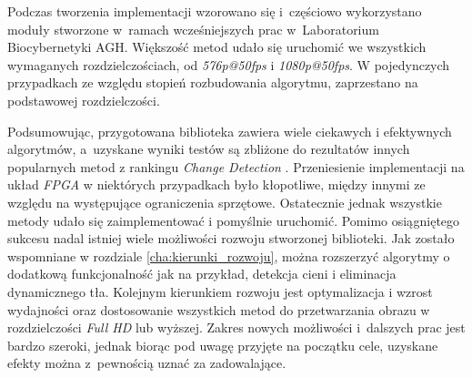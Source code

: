 Podczas tworzenia implementacji wzorowano się i~częściowo wykorzystano moduły stworzone w~ramach wcześniejszych prac  w~Laboratorium Biocybernetyki AGH. 
Większość metod udało się uruchomić we wszystkich wymaganych rozdzielczościach, od \textit{576p@50fps} i \textit{1080p@50fps}. 
W pojedynczych przypadkach ze względu stopień rozbudowania algorytmu, zaprzestano na podstawowej rozdzielczości.

Podsumowując, przygotowana biblioteka zawiera wiele ciekawych i efektywnych algorytmów, a~uzyskane wyniki testów są zbliżone do rezultatów innych popularnych metod z rankingu \textit{Change Detection} \cite{change_detection_web}. 
Przeniesienie implementacji na układ \textit{FPGA} w niektórych przypadkach było kłopotliwe, między innymi ze względu na występujące ograniczenia sprzętowe. 
Ostatecznie jednak wszystkie metody udało się zaimplementować i pomyślnie uruchomić. 
Pomimo osiągniętego sukcesu nadal istniej wiele możliwości rozwoju stworzonej biblioteki. 
Jak zostało wspomniane w rozdziale \ref{cha:kierunki_rozwoju}, można rozszerzyć algorytmy o dodatkową funkcjonalność jak na przykład, detekcja cieni i eliminacja dynamicznego tła. 
Kolejnym kierunkiem rozwoju jest optymalizacja i wzrost wydajności oraz dostosowanie wszystkich metod do przetwarzania obrazu w rozdzielczości \textit{Full HD} lub wyższej. Zakres nowych możliwości i~dalszych prac jest bardzo szeroki, jednak biorąc pod uwagę przyjęte na początku cele, uzyskane efekty można z~pewnością uznać za zadowalające. 
